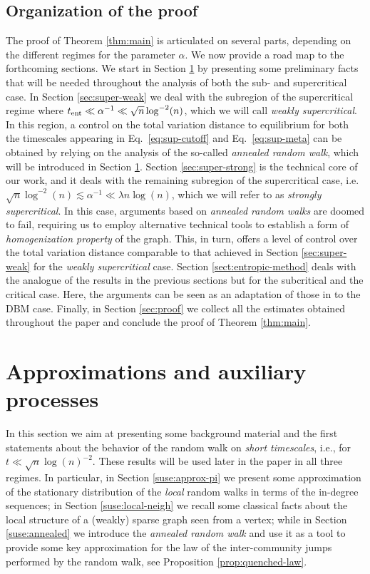 \documentclass[11pt,oneside]{amsart}
\numberwithin{equation}{section}  %
\theoremstyle{plain}
\newcommand{\tent}{t_{\textup{ent}}}
\begin{document}
 \subsection{Organization of the proof}\label{suse:organization-proof}
The proof of Theorem \ref{thm:main} is articulated on several parts, depending on the different regimes for the parameter $\alpha$. We now provide a road map to the forthcoming sections.
We start in Section \ref{sec:prel} by presenting some preliminary facts that will be needed throughout the analysis of both the sub- and supercritical case. In Section \ref{sec:super-weak} we deal with the subregion of the
supercritical regime where $\tent\ll\alpha^{-1}\ll\sqrt{n}\log^{-2}(n)$, which we will call \emph{weakly supercritical}. In this region, a control on the total variation distance to equilibrium for both the timescales appearing in Eq.~\eqref{eq:sup-cutoff} and Eq.~\eqref{eq:sup-meta} can be obtained by relying on the analysis of the so-called \emph{annealed random walk}, which will be introduced in Section \ref{sec:prel}. Section \ref{sec:super-strong} is the technical core of our work, and it deals with the remaining subregion of the supercritical case, i.e. $\sqrt{n}\log^{-2}(n)\lesssim\alpha^{-1}\ll \lambda n\log(n)$, which we will refer to as \emph{strongly supercritical}. 
In this case, arguments based on \emph{annealed random walks} 
are doomed to fail, requiring us to employ alternative technical tools
to establish a form of \emph{homogenization property} of the graph. 
This, in turn, offers a level of control over the total variation distance comparable to that achieved in Section \ref{sec:super-weak} for the \emph{weakly supercritical} case.
 Section \ref{sect:entropic-method} deals with the analogue of the results in the previous sections but for the subcritical and the critical case. Here, the arguments can be seen as an adaptation of those in \cite{BCS1,CCPQ,BP} to the DBM case. Finally, in Section \ref{sec:proof} we collect all the estimates obtained throughout the paper and conclude the proof of Theorem \ref{thm:main}.


\section{Approximations and auxiliary processes}\label{sec:prel}
 In this section we aim at presenting some background material and the first statements about the behavior of the random walk on \emph{short timescales}, i.e., for $t\ll\sqrt{n}\log(n)^{-2}$. These results will be used later in the paper in all three regimes.
 In particular, in Section \ref{suse:approx-pi} we present some approximation of the stationary distribution of the \emph{local} random walks in terms of the in-degree sequences; in Section \ref{suse:local-neigh} we recall some classical facts about the local structure of a (weakly) sparse graph seen from a vertex; while in Section \ref{suse:annealed} we introduce the \emph{annealed random walk} and use it as a tool to provide some key approximation for the law of the inter-community jumps performed by the random walk, see Proposition \ref{prop:quenched-law}. 
\end{document}
